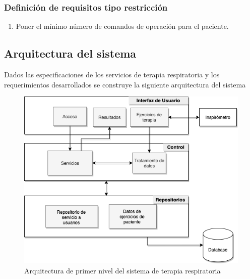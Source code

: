 \documentclass[12pt]{article}
\begin{document}
\subsubsection{Definición de requisitos tipo restricción}

\begin{enumerate}[start=1,label={\bfseries RTR\arabic*.}]

\item Poner el mínimo número de comandos de operación para el paciente.


\end{enumerate}






\newpage


\subsection{Arquitectura del sistema}


Dados las especificaciones de los servicios de terapia respiratoria y los requerimientos desarrollados se construye la siguiente arquitectura del sistema

\begin{figure}[ht]
\centering
\includegraphics[scale=0.5]{imag/C4-Sistema1.png}
\caption{Arquitectura de primer nivel del sistema de terapia respiratoria}
\label{5}
\end{figure}
\FloatBarrier
\end{document}
